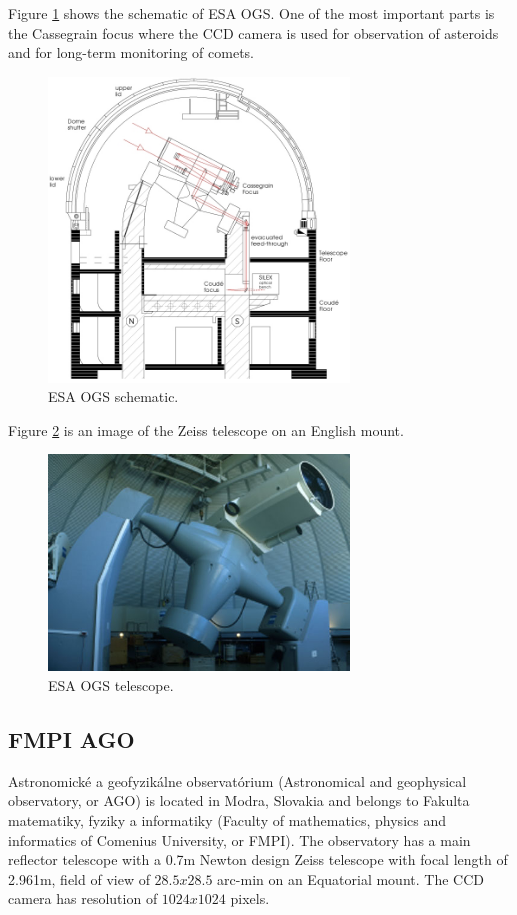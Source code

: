 	Figure \ref{fig:esaogs1} shows the schematic of ESA OGS. One of the most important parts is the Cassegrain focus where the CCD camera is used for observation of asteroids and for long-term monitoring of comets.


\begin{figure}[H]
\centering
  \includegraphics[width=8cm]{images/ESAOGS1}
  \caption{ESA OGS schematic.}
  \label{fig:esaogs1}
\end{figure}

	Figure \ref{fig:esaogs2} is an image of the Zeiss telescope on an English mount.

\begin{figure}[H]
\centering
  \includegraphics[width=8cm]{images/ESAOGS2}
  \caption{ESA OGS telescope.}
  \label{fig:esaogs2}
\end{figure}

\subsection{FMPI AGO}\label{subsec:fmpi_ago}
Astronomické a geofyzikálne observatórium (Astronomical and geophysical observatory, or AGO) is located in Modra, Slovakia and belongs to Fakulta matematiky, fyziky a informatiky (Faculty of mathematics, physics and informatics of Comenius University, or FMPI). The observatory has a main reflector telescope with a 0.7m Newton design Zeiss telescope with focal length of 2.961m, field of view of $28.5 x 28.5$ arc-min on an Equatorial mount. The CCD camera has resolution of $1024 x 1024$ pixels.

